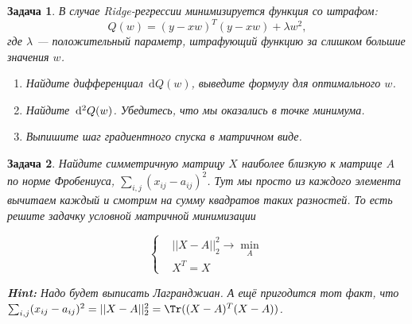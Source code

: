 \documentclass[12pt,fleqn]{article}
\newcommand{\dx}[1]{\,\mathrm{d}#1} %
\newtheorem{esProblem}{Задача}
\begin{document}
\begin{esProblem}
    В случае Ridge-регрессии минимизируется функция со штрафом:
	\[
	Q(w) = (y - xw)^T(y - xw) + \lambda w^2,
	\]
	где $\lambda$ — положительный параметр, штрафующий функцию за слишком большие значения $w$.
	
	\begin{enumerate}
		\item Найдите дифференциал $\dx Q(w)$, выведите формулу для оптимального $w$.
		\item Найдите $\dx^2 Q(w)$. Убедитесь, что мы оказались в точке минимума. 
		\item Выпишите шаг градиентного спуска в матричном виде.
	\end{enumerate}
\end{esProblem}

\begin{esProblem}
    Найдите симметричную матрицу $X$ наиболее близкую к матрице $A$ по норме Фробениуса, $\sum_{i,j} (x_{ij} - a_{ij})^2$. Тут мы просто из каждого элемента вычитаем каждый и смотрим на сумму квадратов таких разностей. То есть решите задачку условной матричной минимизации 
	
	\begin{equation*}
	\begin{cases}
	& ||X - A||_2^2 \to \min_{A}  \\
	& X^T = X
	\end{cases}
	\end{equation*}
	
	\textbf{Hint:} Надо будет выписать Лагранджиан.  А ещё пригодится тот факт, что $\sum_{i,j} (x_{ij} - a_{ij})^2 = ||X - A||_2^2 =  \Tr((X-A)^T (X-A))$.
\end{esProblem}
\end{document}
